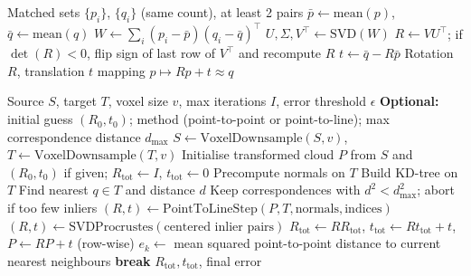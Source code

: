 \documentclass[11pt,a4paper]{article}
\begin{document}
\begin{algorithm}
\caption{Rigid transform from paired points --- SVD / Procrustes}
\begin{algorithmic}[1]
\Require Matched sets $\{p_i\}$, $\{q_i\}$ (same count), at least 2 pairs
\State $\bar{p} \gets \mathrm{mean}(p)$, \quad $\bar{q} \gets \mathrm{mean}(q)$
\State $W \gets \sum_i (p_i - \bar{p})(q_i - \bar{q})^\top$ 
\State $U, \Sigma, V^\top \gets \mathrm{SVD}(W)$
\State $R \gets V U^\top$; if $\det(R)<0$, flip sign of last row of $V^\top$ and recompute $R$
\State $t \gets \bar{q} - R \bar{p}$
\Ensure Rotation $R$, translation $t$ mapping $p \mapsto Rp+t \approx q$
\end{algorithmic}
\end{algorithm}

\begin{algorithm}
\caption{Iterative Closest Point (\texttt{ICP})}
\begin{algorithmic}[1]
\Require Source $S$, target $T$, voxel size $v$, max iterations $I$, error threshold $\epsilon$
\State \textbf{Optional:} initial guess $(R_0,t_0)$; method (point-to-point or point-to-line); max correspondence distance $d_{\max}$
\State $S \gets \mathrm{VoxelDownsample}(S,v)$, \quad $T \gets \mathrm{VoxelDownsample}(T,v)$
\State Initialise transformed cloud $P$ from $S$ and $(R_0,t_0)$ if given; $R_{\mathrm{tot}} \gets I$, $t_{\mathrm{tot}} \gets 0$
    \State Precompute normals on $T$
\EndIf
\State Build KD-tree on $T$
        \State Find nearest $q \in T$ and distance $d$
    \EndFor
        \State Keep correspondences with $d^2 < d_{\max}^2$; abort if too few inliers
    \EndIf
        \State $(R, t) \gets \text{PointToLineStep}(P, T, \text{normals}, \text{indices})$
    \Else
        \State $(R, t) \gets \text{SVDProcrustes}(\text{centered inlier pairs})$
    \EndIf
    \State $R_{\mathrm{tot}} \gets R R_{\mathrm{tot}}$, \quad $t_{\mathrm{tot}} \gets R t_{\mathrm{tot}} + t$, \quad $P \gets R P + t$ (row-wise)
    \State $e_k \gets$ mean squared point-to-point distance to current nearest neighbours
        \State \textbf{break}
    \EndIf
\EndFor
\Ensure $R_{\mathrm{tot}}, t_{\mathrm{tot}}$, final error
\end{algorithmic}
\end{algorithm}

\end{document}
